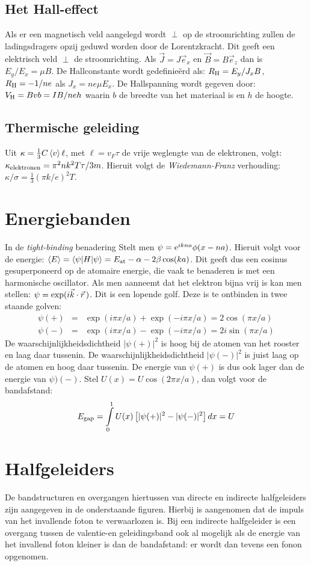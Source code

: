 \subsection{Het Hall-effect}
Als er een magnetisch veld aangelegd wordt $\perp$ op de stroomrichting
zullen de ladingsdragers opzij geduwd worden door de Lorentzkracht. Dit geeft
een elektrisch veld $\perp$ de stroomrichting. Als $\vec{J}=J\vec{e}_x$ en
$\vec{B}=B\vec{e}_z$ dan is $E_y/E_x=\mu B$. De Hallconstante wordt
gedefinie\"erd als: $R_{\rm H}=E_y/J_x B$, $R_{\rm H}=-1/ne$ als
$J_x=ne\mu E_x$. De Hallspanning wordt gegeven door: $V_{\rm H}=Bvb=IB/neh$
waarin $b$ de breedte van het materiaal is en $h$ de hoogte.

\subsection{Thermische geleiding}
Uit $\kappa=\frac{1}{3}C\left\langle v \right\rangle\ell$, met $\ell =v_F\tau$ de vrije weglengte
van de elektronen, volgt: $\kappa_{\rm elektronen}=\pi^2nk^2T\tau/3m$.
Hieruit volgt de {\it Wiedemann-Franz} verhouding:
$\kappa/\sigma=\frac{1}{3}(\pi k/e)^2T$.

\section{Energiebanden}
In de {\it tight-binding} benadering Stelt men
$\psi={\rm e}^{ikna}\phi(x-na)$. Hieruit volgt voor de energie:
$\left\langle E \right\rangle=\left\langle \psi|H|\psi \right\rangle=E_{\rm at}-\alpha-2\beta\cos(ka)$.
Dit geeft dus een cosinus gesuperponeerd op de atomaire energie, die vaak te
benaderen is met een harmonische oscillator. Als men aanneemt dat het elektron
bijna vrij is kan men stellen: $\psi=\exp(i\vec{k}\cdot\vec{r}\,)$. Dit is
een lopende golf. Deze is te ontbinden in twee staande golven:
\begin{eqnarray*}
\psi(+)&=&\exp(i\pi x/a)+\exp(-i\pi x/a)=2\cos(\pi x/a)\\
\psi(-)&=&\exp(i\pi x/a)-\exp(-i\pi x/a)=2i\sin(\pi x/a)
\end{eqnarray*}
De waarschijnlijkheidsdichtheid $|\psi(+)|^2$ is hoog bij de
atomen van het rooster en laag daar tussenin. De waarschijnlijkheidsdichtheid
$|\psi(-)|^2$ is juist laag op de atomen en hoog daar tussenin. De energie
van $\psi(+)$ is dus ook lager dan de energie van $\psi)(-)$. Stel
$U(x)=U\cos(2\pi x/a)$, dan volgt voor de bandafstand:
\[
E_{\rm gap}=\int\limits_0^1 U(x)\left[ |\psi(+)|^2-|\psi(-)|^2\right] dx=U
\]

\section{Halfgeleiders}
De bandstructuren en overgangen hiertussen van directe en indirecte
halfgeleiders zijn aangegeven in de onderstaande figuren. Hierbij is
aangenomen dat de impuls van het invallende foton te verwaarlozen is. Bij een
indirecte halfgeleider is een overgang tussen de valentie-en geleidingsband
ook al mogelijk als de energie van het invallend foton kleiner is dan de
bandafstand: er wordt dan tevens een fonon opgenomen.

